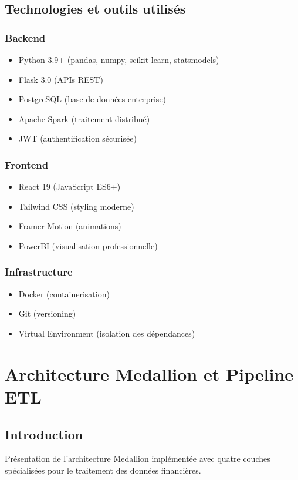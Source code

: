 \documentclass[12pt,a4paper]{article}
\begin{document}
\subsection{Technologies et outils utilisés}
\subsubsection{Backend}
\begin{itemize}
    \item Python 3.9+ (pandas, numpy, scikit-learn, statsmodels)
    \item Flask 3.0 (APIs REST)
    \item PostgreSQL (base de données enterprise)
    \item Apache Spark (traitement distribué)
    \item JWT (authentification sécurisée)
\end{itemize}

\subsubsection{Frontend}
\begin{itemize}
    \item React 19 (JavaScript ES6+)
    \item Tailwind CSS (styling moderne)
    \item Framer Motion (animations)
    \item PowerBI (visualisation professionnelle)
\end{itemize}

\subsubsection{Infrastructure}
\begin{itemize}
    \item Docker (containerisation)
    \item Git (versioning)
    \item Virtual Environment (isolation des dépendances)
\end{itemize}

\section{Architecture Medallion et Pipeline ETL}

\subsection{Introduction}
Présentation de l'architecture Medallion implémentée avec quatre couches spécialisées pour le traitement des données financières.
\end{document}
